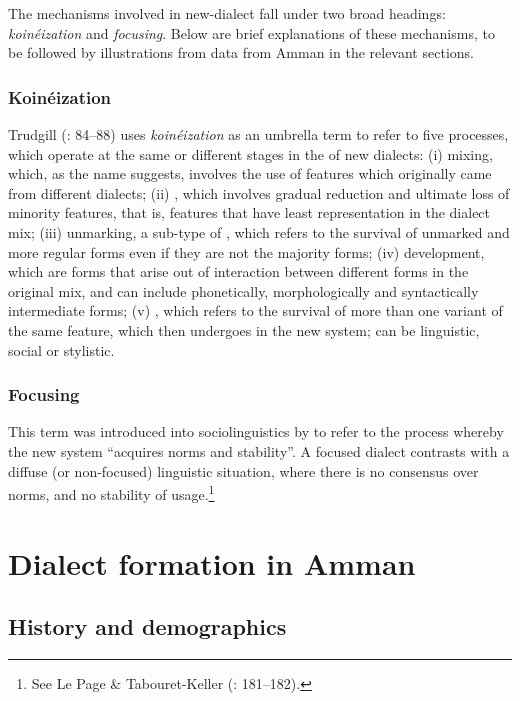 \documentclass[output=paper]{langsci/langscibook}
\begin{document}
The mechanisms involved in new-dialect  fall under two broad headings: \textit{koinéization} and \textit{focusing}. Below are brief explanations of these mechanisms, to be followed by illustrations from data from Amman in the relevant sections.


\subsubsection{Koinéization}

Trudgill (\citeyear{Trudgill2004}: 84–88) uses \textit{koinéization} as an umbrella term to refer to five processes, which operate at the same or different stages in the  of new dialects: (i) mixing, which, as the name suggests, involves the use of features which originally came from different dialects; (ii) , which involves gradual reduction and ultimate loss of minority features, that is, features that have least representation in the dialect mix; (iii) unmarking, a sub-type of , which refers to the survival of unmarked and more regular forms even if they are not the majority forms; (iv)  development, which are forms that arise out of interaction between different forms in the original mix, and can include phonetically, morphologically and syntactically  intermediate forms; (v) , which refers to the survival of more than one variant of the same feature, which then undergoes  in the new system;  can be linguistic, social or stylistic.

\subsubsection{Focusing} \label{focussec}

This term was introduced into sociolinguistics by \citet{LePageTabouret-Keller1985} to refer to the process whereby the new system “acquires norms and stability”. A focused dialect contrasts with a diffuse (or non-focused) linguistic situation, where there is no consensus over norms, and no stability of usage.\footnote{See Le Page \& Tabouret-Keller (\citeyear{LePageTabouret-Keller1985}: 181–182).}

\section{Dialect formation in Amman}

\subsection{History and demographics}
\end{document}
